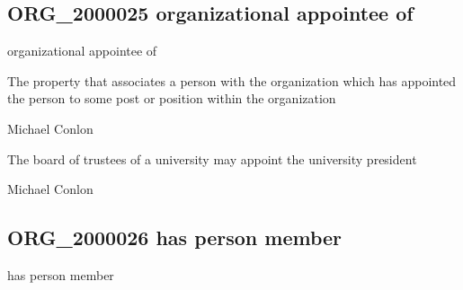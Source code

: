 \documentclass[letterpaper,10pt,english]{sphinxmanual}
\begin{document}
\subsection{ORG\_2000025 \sphinxhyphen{} organizational appointee of}
\label{\detokenize{doc-ORG_2000025:org-2000025-organizational-appointee-of}}\label{\detokenize{doc-ORG_2000025:index-0}}\label{\detokenize{doc-ORG_2000025::doc}}
\begin{sphinxShadowBox}

\sphinxAtStartPar
organizational appointee of
\end{sphinxShadowBox}

\begin{sphinxShadowBox}

\sphinxAtStartPar
The property that associates a person with the organization which has appointed the person to some post or position within the organization
\end{sphinxShadowBox}

\begin{sphinxShadowBox}

\sphinxAtStartPar
Michael Conlon 
\end{sphinxShadowBox}

\begin{sphinxShadowBox}

\sphinxAtStartPar
The board of trustees of a university may appoint the university president
\end{sphinxShadowBox}

\begin{sphinxShadowBox}

\sphinxAtStartPar
Michael Conlon 
\end{sphinxShadowBox}
\begin{quote}

\ignorespaces \end{quote}


\subsection{ORG\_2000026 \sphinxhyphen{} has person member}
\label{\detokenize{doc-ORG_2000026:org-2000026-has-person-member}}\label{\detokenize{doc-ORG_2000026:index-0}}\label{\detokenize{doc-ORG_2000026::doc}}
\begin{sphinxShadowBox}

\sphinxAtStartPar
has person member
\end{sphinxShadowBox}
\end{document}
